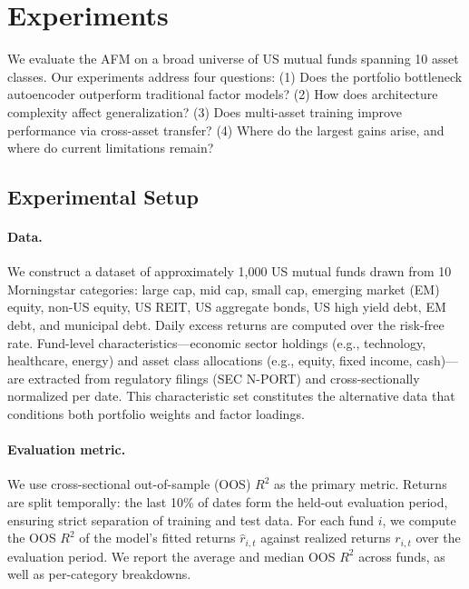 
\section{Experiments}\label{sec:experiments}

We evaluate the AFM on a broad universe of US mutual funds spanning 10 asset classes. Our experiments address four questions: (1) Does the portfolio bottleneck autoencoder outperform traditional factor models? (2) How does architecture complexity affect generalization? (3) Does multi-asset training improve performance via cross-asset transfer? (4) Where do the largest gains arise, and where do current limitations remain?

\subsection{Experimental Setup}\label{sec:setup}

\paragraph{Data.}
We construct a dataset of approximately 1,000 US mutual funds drawn from 10 Morningstar categories: large cap, mid cap, small cap, emerging market (EM) equity, non-US equity, US REIT, US aggregate bonds, US high yield debt, EM debt, and municipal debt. Daily excess returns are computed over the risk-free rate. Fund-level characteristics---economic sector holdings (e.g., technology, healthcare, energy) and asset class allocations (e.g., equity, fixed income, cash)---are extracted from regulatory filings (SEC N-PORT) and cross-sectionally normalized per date. This characteristic set constitutes the alternative data that conditions both portfolio weights and factor loadings.

\paragraph{Evaluation metric.}
We use cross-sectional out-of-sample (OOS) $R^2$ as the primary metric. Returns are split temporally: the last 10\% of dates form the held-out evaluation period, ensuring strict separation of training and test data. For each fund $i$, we compute the OOS $R^2$ of the model's fitted returns $\hat{r}_{i,t}$ against realized returns $r_{i,t}$ over the evaluation period. We report the average and median OOS $R^2$ across funds, as well as per-category breakdowns.

